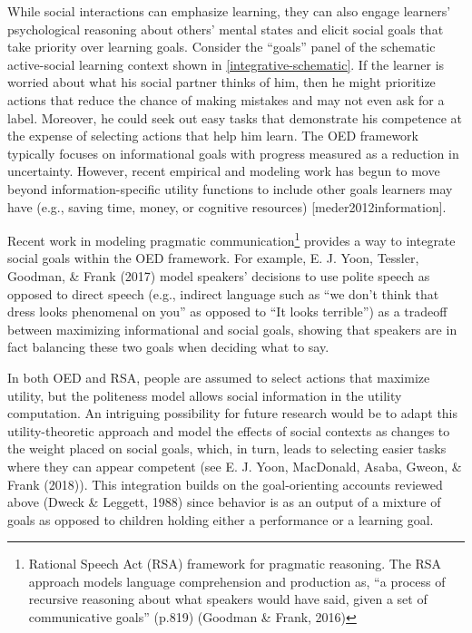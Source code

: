 \documentclass[oneside]{report}
\begin{document}
While social interactions can emphasize learning, they can also engage
learners' psychological reasoning about others' mental states and elicit
social goals that take priority over learning goals. Consider the
``goals'' panel of the schematic active-social learning context shown in
\ref{integrative-schematic}. If the learner is worried about what his
social partner thinks of him, then he might prioritize actions that
reduce the chance of making mistakes and may not even ask for a label.
Moreover, he could seek out easy tasks that demonstrate his competence
at the expense of selecting actions that help him learn. The OED
framework typically focuses on informational goals with progress
measured as a reduction in uncertainty. However, recent empirical and
modeling work has begun to move beyond information-specific utility
functions to include other goals learners may have (e.g., saving time,
money, or cognitive resources) {[}meder2012information{]}.

Recent work in modeling pragmatic communication\footnote{Rational Speech
  Act (RSA) framework for pragmatic reasoning. The RSA approach models
  language comprehension and production as, ``a process of recursive
  reasoning about what speakers would have said, given a set of
  communicative goals'' (p.819) (Goodman \& Frank, 2016)} provides a way
to integrate social goals within the OED framework. For example, E. J.
Yoon, Tessler, Goodman, \& Frank (2017) model speakers' decisions to use
polite speech as opposed to direct speech (e.g., indirect language such
as ``we don't think that dress looks phenomenal on you'' as opposed to
``It looks terrible'') as a tradeoff between maximizing informational
and social goals, showing that speakers are in fact balancing these two
goals when deciding what to say.

In both OED and RSA, people are assumed to select actions that maximize
utility, but the politeness model allows social information in the
utility computation. An intriguing possibility for future research would
be to adapt this utility-theoretic approach and model the effects of
social contexts as changes to the weight placed on social goals, which,
in turn, leads to selecting easier tasks where they can appear competent
(see E. J. Yoon, MacDonald, Asaba, Gweon, \& Frank (2018)). This
integration builds on the goal-orienting accounts reviewed above (Dweck
\& Leggett, 1988) since behavior is as an output of a mixture of goals
as opposed to children holding either a performance or a learning goal.
\end{document}
